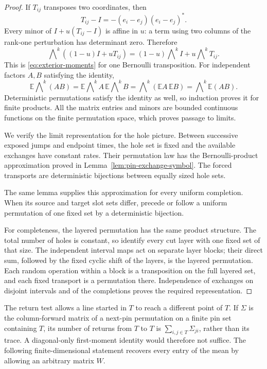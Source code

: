 \begin{proof}
If \(T_{ij}\) transposes two coordinates, then
\[
 T_{ij}-I=-(e_i-e_j)(e_i-e_j)^*.
\]
Every minor of \(I+u(T_{ij}-I)\) is affine in \(u\): a term using
two columns of the rank-one perturbation has determinant zero.
Therefore
\[
 \bigwedge\nolimits^k((1-u)I+uT_{ij})
  =(1-u)\bigwedge\nolimits^kI+u\bigwedge\nolimits^kT_{ij}.
\]
This is \eqref{eq:exterior-moments} for one Bernoulli transposition.
For independent factors \(A,B\) satisfying the identity,
\[
 \mathbb E\bigwedge\nolimits^k(AB)
   =\mathbb E\bigwedge\nolimits^kA\,
      \mathbb E\bigwedge\nolimits^kB
   =\bigwedge\nolimits^k(\mathbb EA\,\mathbb EB)
   =\bigwedge\nolimits^k\mathbb E(AB).
\]
Deterministic permutations satisfy the identity as well, so induction
proves it for finite products.  All the matrix entries and minors are
bounded continuous functions on the finite permutation space, which
proves passage to limits.

We verify the limit representation for the hole picture.  Between
successive exposed jumps and endpoint times, the hole set is fixed and
the available exchanges have constant rates.  Their permutation law has
the Bernoulli-product approximation proved in
Lemma~\ref{lem:pin-exchange-symbol}.
The forced transports are deterministic bijections between equally
sized hole sets.

The same lemma supplies this approximation for every uniform completion.
When its source and target slot sets differ, precede or follow a uniform
permutation of one fixed set by a deterministic bijection.

For completeness, the layered permutation has the same product
structure.  The total number of holes is constant, so identify every
cut layer with one fixed set of that size.  The independent interval
maps act on separate layer blocks; their direct sum, followed by the
fixed cyclic shift of the layers, is the layered permutation.  Each
random operation within a block is a transposition on the full layered
set, and each fixed transport is a permutation there.  Independence
of exchanges on disjoint intervals and of the completions proves the
required representation.
\end{proof}

The return test allows a line started in \(T\) to reach a different
point of \(T\).  If \(\Sigma\) is the column-forward matrix of a
next-pin permutation on a finite pin set containing \(T\), its number
of returns from \(T\) to \(T\) is
\(\sum_{i,j\in T}\Sigma_{ji}\), rather than its trace.
A diagonal-only first-moment identity would therefore not suffice.
The following finite-dimensional statement recovers every entry of
the mean by allowing an arbitrary matrix \(W\).

